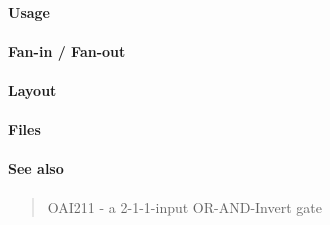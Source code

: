 \paragraph{Usage}

\paragraph{Fan-in / Fan-out}

\paragraph{Layout}

\paragraph{Files}

\paragraph{See also}
\begin{quote}
    OAI211 - a 2-1-1-input OR-AND-Invert gate
\end{quote}
